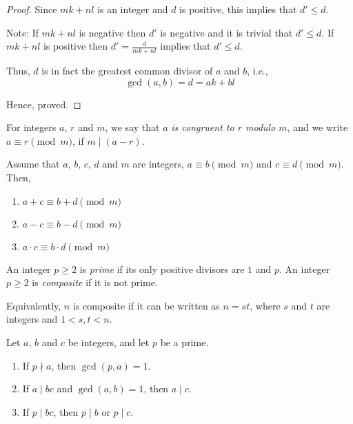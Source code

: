 \begin{proof}
	Since $mk + nl$ is an integer and $d$ is positive, this implies that $d' \leq d$.

	Note: If $mk+nl$ is negative then $d'$ is negative and it is trivial that $d' \leq d$. If $mk+nl$ is positive then $d' = \frac{d}{mk+nl}$ implies that $d' \leq d$.

	Thus, $d$ is in fact the greatest common divisor of $a$ and $b$, i.e., $$\gcd(a, b) = d = ak + bl$$

	Hence, proved.
\end{proof}

\begin{definition} \label{mod}
	For integers $a$, $r$ and $m$, we say that $a$ \emph{is congruent to $r$ modulo $m$}, and we write $a \equiv r \pmod m$, if $m \mid (a-r)$.
\end{definition}

\begin{proposition}
	Assume that $a$, $b$, $c$, $d$ and $m$ are integers, $a \equiv b \pmod m$ and $c \equiv d \pmod m$. Then,

	\begin{enumerate}
		\item $a + c \equiv b + d \pmod m$
		\item $a - c \equiv b - d \pmod m$
		\item $a \cdot c \equiv b \cdot d \pmod m$
	\end{enumerate}
\end{proposition}

\begin{definition}
	An integer $p \geq 2$ is \emph{prime} if its only positive divisors are $1$ and $p$. An integer $p \geq 2$ is \emph{composite} if it is not prime.

	Equivalently, $n$ is composite if it can be written as $n = st$, where $s$ and $t$ are integers and $1 < s,t < n$.
\end{definition}

\begin{lemma} \label{modprime}
	Let $a$, $b$ and $c$ be integers, and let $p$ be a prime.
	\begin{enumerate}
		\item If $p \nmid a$, then $\gcd(p, a) = 1$.
		\item If $a \mid bc$ and $\gcd(a, b) = 1$, then $a \mid c$.
		\item If $p \mid bc$, then $p \mid b$ or $p \mid c$.
	\end{enumerate}
\end{lemma}

